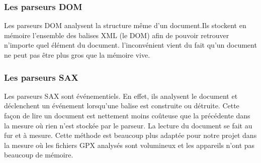 \subsubsection{Les parseurs DOM}
Les parseurs DOM analysent la structure même d'un document.Ils stockent en mémoire l'ensemble des balises XML (le DOM) afin de pouvoir retrouver n'importe quel élément du document. l'inconvénient vient du fait qu'un document ne peut pas être plus gros que la mémoire vive. 

\subsubsection{Les parseurs SAX}
Les parseurs SAX sont événementiels. En effet, ils analysent le document et déclenchent un événement lorsqu'une balise est construite ou détruite. Cette façon de lire un document est nettement moins coûteuse que la précédente dans la mesure où rien n'est stockée par le parseur. La lecture du document se fait au fur et à mesure. Cette méthode est beaucoup plus adaptée pour notre projet dans la mesure où les fichiers GPX analysés sont volumineux et les appareils n'ont pas beaucoup de mémoire. 
